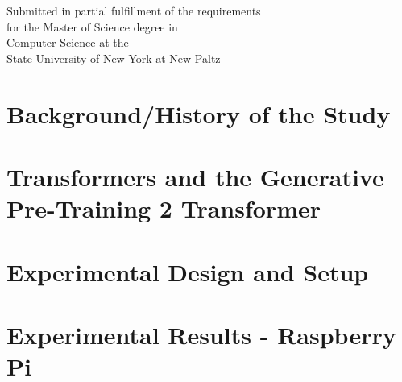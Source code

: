 \documentclass[english]{report}
\begin{document}
\iffalse
\begin{flushright}
	Approved on \_\_\_\_\_\_\_\_\_\_\_\_\_\_\_\_\_\_\_\_\_
\end{flushright}
\fi

\vspace{1cm}

\begin{center}
	Submitted in partial fulfillment of the requirements \\
	for the Master of Science degree in \\
	Computer Science at the \\
	State University of New York at New Paltz \\
\end{center}


\newpage



\vspace{5mm}


\newpage

\tableofcontents

\newpage

\listoffigures
\listoftables



\newpage
{}

	


\chapter{Background/History of the Study}



\chapter{Transformers and the Generative Pre-Training 2 Transformer}



\chapter{Experimental Design and Setup}



\chapter{Experimental Results - Raspberry Pi}
\end{document}
